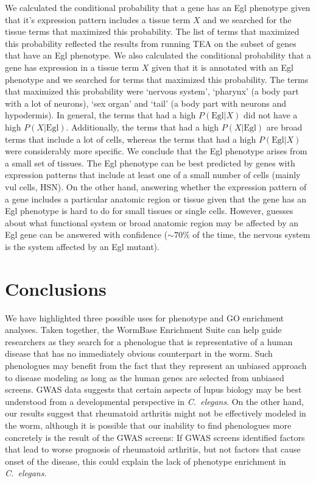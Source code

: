 \documentclass[10pt,letterpaper,twocolumn]{article}
\newcommand{\cel}{\emph{C.~elegans}}
\begin{document}
We calculated the conditional probability that a gene has an Egl phenotype given
that it's expression pattern includes a tissue term $X$ and we searched for the
tissue terms that maximized this probability. The list of terms that maximized this
probability reflected the results from running TEA on the subset of genes that have
an Egl phenotype. We also calculated the conditional probability that a gene has
expression in a tissue term $X$ given that it is annotated with an Egl phenotype
and we searched for terms that maximized this probability. The terms that maximized
this probability were `nervous system', `pharynx' (a body part with a lot of neurons),
`sex organ' and `tail' (a body part with neurons and hypodermis). In general, the
terms that had a high $P(\text{Egl}|X)$ did not have a high $P(X|\text{Egl})$.
Additionally, the terms that had a high $P(X|\text{Egl})$ are broad terms that
include a lot of cells, whereas the terms that had a high $P(\text{Egl}|X)$
were considerably more specific.
We conclude that the Egl phenotype arises from a small set of tissues. The Egl
phenotype can be best predicted by genes with expression patterns that include
at least one of a small number of cells (mainly vul cells, HSN). On the other
hand, answering whether the expression pattern of a gene includes a particular
anatomic region or tissue given that the gene has an Egl phenotype is hard to
do for small tissues or single cells. However, guesses about what functional system
or broad anatomic region may be affected by an Egl gene can be answered with
confidence ($\sim70\%$ of the time, the nervous system is the system
affected by an Egl mutant).

\section*{Conclusions}

We have highlighted three possible uses for phenotype and GO enrichment analyses.
Taken together, the WormBase Enrichment Suite can help guide researchers as they
search for a phenologue that is representative of a human disease that has no
immediately obvious counterpart in the worm. Such phenologues may benefit from
the fact that they represent an unbiased approach to disease modeling as long as
the human genes are selected from unbiased screens. GWAS data suggests that certain
aspects of lupus biology may be best understood from a developmental perspective
in \cel{}. On the other hand, our results suggest that rheumatoid arthritis
might not be effectively modeled in the worm, although it is possible that our
inability to find phenologues more concretely is the result of the GWAS screens:
If GWAS screens identified factors that lead to worse prognosis of rheumatoid
arthritis, but not factors that cause onset of the disease, this could explain
the lack of phenotype enrichment in \cel{}.
\end{document}
